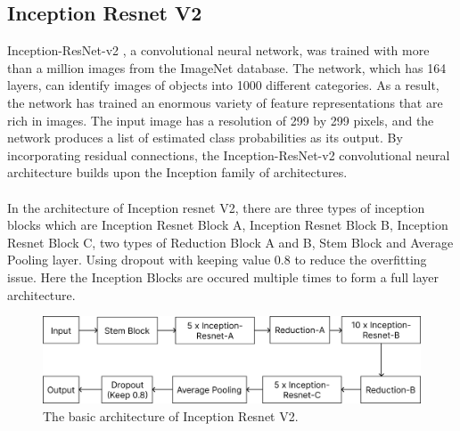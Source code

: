 \documentclass[a4paper,12pt,oneside]{book}
\begin{document}
\subsection{Inception Resnet V2}
Inception-ResNet-v2 \cite{szegedy2016inceptionv4}, a convolutional neural network, was trained with more than a million images from the ImageNet database. The network, which has 164 layers, can identify images of objects into 1000 different categories. As a result, the network has trained an enormous variety of feature representations that are rich in images. The input image has a resolution of 299 by 299 pixels, and the network produces a list of estimated class probabilities as its output.
By incorporating residual connections, the Inception-ResNet-v2 convolutional neural architecture builds upon the Inception family of architectures.
\\\\In the architecture of Inception resnet V2, there are three types of inception blocks which are Inception Resnet Block A, Inception Resnet Block B, Inception Resnet Block C, two types of Reduction Block A and B, Stem Block and Average Pooling layer. Using dropout with keeping value 0.8 to reduce the overfitting issue. Here the Inception Blocks are occured multiple times to form a full layer architecture.\\
\begin{figure}[!hbtp]
\centering
\includegraphics[width=1\textwidth]{Figures/irv2_arc.png}
\captionsetup{font=small}
\vspace{10pt}
\caption{The basic architecture of Inception Resnet V2.}
\label{fig:resnet}
\end{figure}
\end{document}
